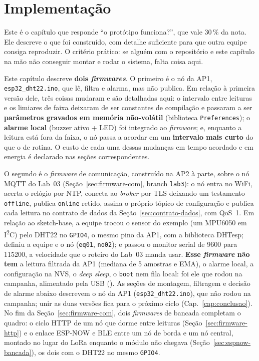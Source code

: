 \chapter{Implementação}
\label{cap:implementacao}
\rubricaFuncionalidade

\begin{orientacao}
Este é o capítulo que responde \enquote{o protótipo funciona?}, que vale
30\,\% da nota. Ele descreve o que foi construído, com detalhe
suficiente para que outra equipe consiga reproduzir. O critério prático:
se alguém com o repositório e este capítulo na mão não conseguir montar
e rodar o sistema, falta coisa aqui.
\end{orientacao}

Este capítulo descreve \textbf{dois \emph{firmwares}}. O primeiro é o
nó da AP1, \texttt{esp32\_dht22.ino}, que lê, filtra e alarma, mas não
publica. Em relação à primeira versão dele, três coisas mudaram e são
detalhadas aqui: o intervalo entre
leituras e os limiares de faixa deixaram de ser constantes de
compilação e passaram a ser \textbf{parâmetros gravados em memória
não-volátil} (biblioteca \texttt{Preferences}); o \textbf{alarme local}
(buzzer ativo + LED) foi integrado ao \emph{firmware}; e, enquanto a
leitura está fora da faixa, o nó passa a acordar em um
\textbf{intervalo mais curto} do que o de rotina. O custo de cada uma
dessas mudanças em tempo acordado e em energia é declarado nas seções
correspondentes.

O segundo é o \emph{firmware} de comunicação, construído na AP2 à
parte, sobre o nó MQTT do Lab~03 (Seção~\ref{sec:firmware-com}, branch
\texttt{lab3}): o nó entra no WiFi, acerta o relógio por NTP, conecta ao
\emph{broker} por TLS deixando um testamento \texttt{offline}, publica
\texttt{online} retido, assina o próprio tópico de configuração e
publica cada leitura no contrato de dados da
Seção~\ref{sec:contrato-dados}, com QoS~1. Em relação ao sketch-base, a
equipe trocou o sensor do exemplo (um MPU6050 em I\textsuperscript{2}C)
pelo DHT22 no \texttt{GPIO4}, o mesmo pino da AP1, com a biblioteca
DHTesp; definiu a equipe e o nó (\texttt{eq01}, \texttt{no02}); e
passou o monitor serial de 9600 para \SI{115200}{\baud}, a velocidade que
o roteiro do Lab~03 manda usar.
\textbf{Esse \emph{firmware} não tem} a leitura filtrada da AP1 (mediana
de 5 amostras e EMA), o alarme local, a configuração na NVS, o
\emph{deep sleep}, o \texttt{boot} nem fila local: foi ele que rodou na
campanha, alimentado pela USB (). As seções de montagem, filtragem
e decisão de alarme abaixo descrevem o nó da AP1 (\texttt{esp32\_dht22.ino}),
que não rodou na campanha; unir as duas versões fica para o próximo
ciclo (Cap.~\ref{cap:conclusao}). No fim da Seção~\ref{sec:firmware-com},
dois \emph{firmwares} de bancada completam o quadro: o ciclo HTTP de um
nó que dorme entre leituras (Seção~\ref{sec:firmware-http}) e o enlace
ESP-NOW e BLE entre um nó de borda e um nó central, montado no lugar do
LoRa enquanto o módulo não chegava (Seção~\ref{sec:espnow-bancada}), os
dois com o DHT22 no mesmo \texttt{GPIO4}.


